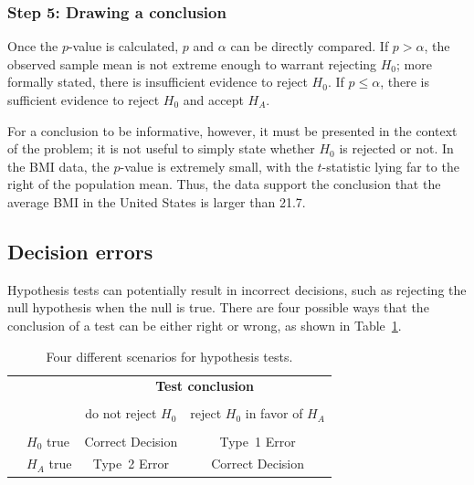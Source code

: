 \begin{spacing}{1.5}
\subsubsection{Step 5: Drawing a conclusion}

Once the $p$-value is calculated, $p$ and $\alpha$ can be directly compared. If $p > \alpha$, the observed sample mean is not extreme enough to warrant rejecting $H_0$; more formally stated, there is insufficient evidence to reject $H_0$. If $p \leq \alpha$, there is sufficient evidence to reject $H_0$ and accept $H_A$. 

For a conclusion to be informative, however, it must be presented in the context of the problem; it is not useful to simply state whether $H_0$ is rejected or not. In the  BMI data, the $p$-value is extremely small, with the $t$-statistic lying far to the right of the population mean. Thus, the data support the conclusion that the average BMI in the United States is larger than 21.7. 



\subsection{Decision errors}

Hypothesis tests can potentially result in incorrect decisions, such as rejecting the null hypothesis when the null is true. There are four possible ways that the conclusion of a test can be either right or wrong, as shown in Table~\ref{fourHTScenarios}. 

\begin{table}[ht]
	\centering
	\begin{tabular}{l l c c}
		& & \multicolumn{2}{c}{\textbf{Test conclusion}} \\
		\cline{3-4}
		\vspace{-3.7mm} \\
		& & do not reject $H_0$ &  reject $H_0$ in favor of $H_A$ \\
		\cline{2-4}
		\vspace{-3.7mm} \\
		& $H_0$ true & Correct Decision &  Type~1 Error \\
		\raisebox{1.5ex}{\textbf{Truth}} & $H_A$ true & Type~2 Error & Correct Decision\\
		\cline{2-4}
	\end{tabular}
	\caption{Four different scenarios for hypothesis tests.}
	\label{fourHTScenarios}
\end{table}


\end{spacing}
